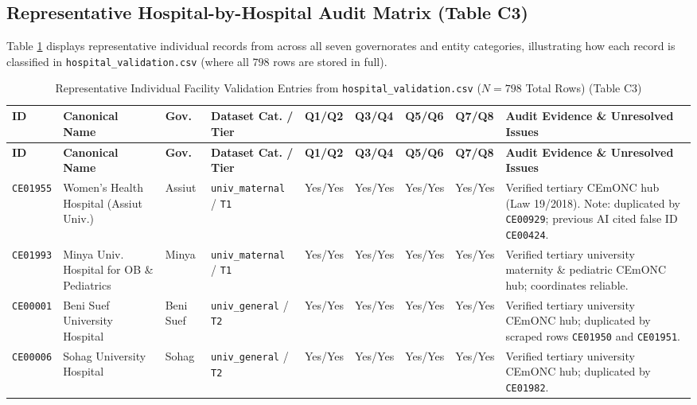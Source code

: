\documentclass[10pt,a4paper]{article}
\begin{document}
\subsection{Representative Hospital-by-Hospital Audit Matrix (Table C3)}
Table \ref{tab:table_c3} displays representative individual records from across all seven governorates and entity categories, illustrating how each record is classified in \texttt{hospital\_validation.csv} (where all $798$ rows are stored in full).

{\scriptsize
\begin{longtable}{p{1.05cm} p{2.7cm} p{1.1cm} p{1.95cm} p{0.95cm} p{0.95cm} p{0.95cm} p{0.95cm} p{3.4cm}}
\caption{Representative Individual Facility Validation Entries from \texttt{hospital\_validation.csv} ($N = 798$ Total Rows) (Table C3)} \label{tab:table_c3} \\
\toprule
\textbf{ID} & \textbf{Canonical Name} & \textbf{Gov.} & \textbf{Dataset Cat. / Tier} & \textbf{Q1/Q2} & \textbf{Q3/Q4} & \textbf{Q5/Q6} & \textbf{Q7/Q8} & \textbf{Audit Evidence \& Unresolved Issues} \\
\midrule
\endfirsthead
\toprule
\textbf{ID} & \textbf{Canonical Name} & \textbf{Gov.} & \textbf{Dataset Cat. / Tier} & \textbf{Q1/Q2} & \textbf{Q3/Q4} & \textbf{Q5/Q6} & \textbf{Q7/Q8} & \textbf{Audit Evidence \& Unresolved Issues} \\
\midrule
\endhead
\bottomrule
\endlastfoot
\texttt{CE01955} & Women's Health Hospital (Assiut Univ.) & Assiut & \texttt{univ\_maternal} / \texttt{T1} & Yes/Yes & Yes/Yes & Yes/Yes & Yes/Yes & Verified tertiary CEmONC hub (Law 19/2018). Note: duplicated by \texttt{CE00929}; previous AI cited false ID \texttt{CE00424}. \\[0.3em]
\texttt{CE01993} & Minya Univ. Hospital for OB \& Pediatrics & Minya & \texttt{univ\_maternal} / \texttt{T1} & Yes/Yes & Yes/Yes & Yes/Yes & Yes/Yes & Verified tertiary university maternity \& pediatric CEmONC hub; coordinates reliable. \\[0.3em]
\texttt{CE00001} & Beni Suef University Hospital & Beni Suef & \texttt{univ\_general} / \texttt{T2} & Yes/Yes & Yes/Yes & Yes/Yes & Yes/Yes & Verified tertiary university CEmONC hub; duplicated by scraped rows \texttt{CE01950} and \texttt{CE01951}. \\[0.3em]
\texttt{CE00006} & Sohag University Hospital & Sohag & \texttt{univ\_general} / \texttt{T2} & Yes/Yes & Yes/Yes & Yes/Yes & Yes/Yes & Verified tertiary university CEmONC hub; duplicated by \texttt{CE01982}. \\[0.3em]

\end{longtable}}
\end{document}
